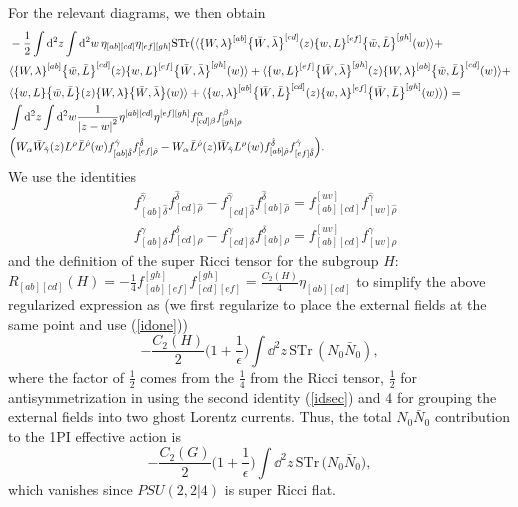 \documentclass[12pt]{article}
\def\be{\begin{equation}}
\def\ee{\end{equation}}
\numberwithin{equation}{section}
\newcommand{\h}[1]{\hat{#1}}
\begin{document}
For the relevant diagrams, we then obtain
\be
\begin{aligned}
	&-\frac{1}{2}\int \dd^2 z \int \dd^2 w \, \eta_{[ab][cd]} \eta_{[ef][gh]} \text{STr} \big(\langle \acomm{W}{\lambda}^{[ab]} \acomm{\bar{W}}{\bar{\lambda}}^{[cd]}(z) \acomm{w}{L}^{[ef]} \acomm{\bar{w}}{\bar{L}}^{[gh]}(w) \rangle + \\
		&\langle \acomm{W}{\lambda}^{[ab]} \acomm{\bar{w}}{\bar{L}}^{[cd]}(z) \acomm{w}{L}^{[ef]} \acomm{\bar{W}}{\bar{\lambda}}^{[gh]}(w) \rangle + \langle \acomm{w}{L}^{[ef]} \acomm{\bar{W}}{\bar{\lambda}}^{[gh]}(z) \acomm{W}{\lambda}^{[ab]} \acomm{\bar{w}}{\bar{L}}^{[cd]}(w)\rangle + \\
		&\langle \acomm{w}{L}\acomm{\bar{w}}{\bar{L}}(z) \acomm{W}{\lambda}\acomm{\bar{W}}{\bar{\lambda}}(w)\rangle + \langle \acomm{w}{\lambda}^{[ab]} \acomm{\bar{W}}{\bar{L}}^{[cd]}(z) \acomm{w}{\lambda}^{[ef]} \acomm{\bar{W}}{\bar{L}}^{[gh]}(w) \rangle \big) =
	      \\& \int \dd^2 z \int \dd^2 w \frac{1}{\abs{z-w}^2} \eta^{[ab][cd]} \eta^{[ef][gh]} f_{[cd]\beta}^\alpha f_{[gh]\rho}^\beta \\&
	      \Big(W_\alpha \bar{W}_{\h{\gamma}}(z) L^\rho \bar{L}^{\h{\rho}}(w) f^{\h{\gamma}}_{[ab]\h{\delta}} f^{\h{\delta}}_{[ef]\h{\rho}} - W_\alpha \bar{L}^{\h{\rho}}(z)\bar{W}_{\h{\gamma}} L^\rho(w) f^{\h{\delta}}_{[ab]\h{\rho}} f^{\h{\gamma}}_{[ef]\h{\delta}}\Big).
\end{aligned}
\ee
We use the identities
\begin{align}
\label{idone}
&f_{[ab]\h{\delta}}^{\h{\gamma}} f^{\h{\delta}}_{[cd]\h{\rho}} - f^{\h{\gamma}}_{[cd]\h{\delta}} f^{\h{\delta}}_{[ab]\h{\rho}} = f_{[ab][cd]}^{[uv]} f_{[uv]\h{\rho}}^{\h{\gamma}} \\
&f_{[ab]\delta}^{\gamma} f^{\delta}_{[cd]\rho} - f^{\gamma}_{[cd]\delta} f^{\delta}_{[ab] \rho} = f_{[ab][cd]}^{[uv]} f_{[uv]\rho}^{\gamma}
\label{idsec}
\end{align}
and the definition of the super Ricci tensor for the subgroup $H$: $R_{[ab][cd]}(H) = -\frac{1}{4} f_{[ab][ef]}^{[gh]} f^{[gh]}_{[cd][ef]} = \frac{C_2(H)}{4} \eta_{[ab][cd]}$ to simplify the above regularized expression as (we first regularize to place the external fields at the same point and use (\ref{idone}))
\be
-\frac{C_2(H)}{2} \big(1 + \frac{1}{\epsilon}\big) \int \dd^2z\, \text{STr}\, (N_0 \bar{N}_0),
\ee
where the factor of $\frac{1}{2}$ comes from the $\frac{1}{4}$ from the Ricci tensor, $\frac{1}{2}$ for antisymmetrization in using the second identity (\ref{idsec}) and $4$ for grouping the external fields into two ghost Lorentz currents. Thus, the total $N_0 \bar{N}_0$ contribution to the 1PI effective action is
\be
-\frac{C_2(G)}{2} \big(1+\frac{1}{\epsilon}\big) \int \dd^2z\,  \text{STr}\,\big(N_0\bar{N}_0\big),
\ee
which vanishes since $PSU(2,2|4)$ is super Ricci flat.
\end{document}
